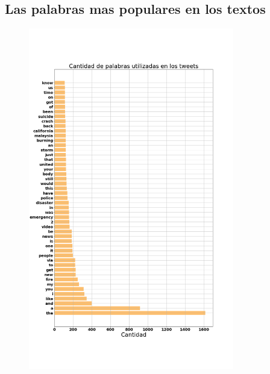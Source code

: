 \documentclass[titlepage,a4paper]{article}
\begin{document}
\subsection{\Large Las palabras mas populares en los textos}
{\Large
\begin{figure}[H]
 \centering
 \includegraphics[width=0.8\textwidth, height=0.9\textheight, keepaspectratio]{graficos/cantidad_palabras_utilizadas_tweets_0.png}
\end{figure}
\par}
\end{document}
